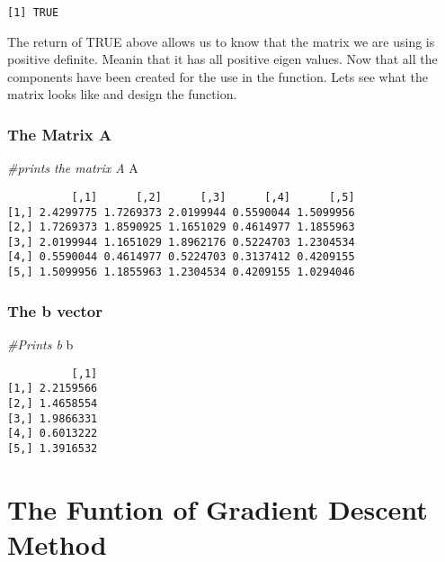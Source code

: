 \documentclass[]{article}
\newenvironment{Shaded}{\begin{snugshade}}{\end{snugshade}}
\newcommand{\CommentTok}[1]{\textcolor[rgb]{0.56,0.35,0.01}{\textit{#1}}}
\newcommand{\NormalTok}[1]{#1}
\begin{document}
\begin{verbatim}
[1] TRUE
\end{verbatim}

The return of TRUE above allows us to know that the matrix we are using
is positive definite. Meanin that it has all positive eigen values. Now
that all the components have been created for the use in the function.
Lets see what the matrix looks like and design the function.

\subsubsection{The Matrix A}\label{the-matrix-a}

\begin{Shaded}
\begin{Highlighting}[]
\CommentTok{#prints the matrix A}
\NormalTok{A}
\end{Highlighting}
\end{Shaded}

\begin{verbatim}
          [,1]      [,2]      [,3]      [,4]      [,5]
[1,] 2.4299775 1.7269373 2.0199944 0.5590044 1.5099956
[2,] 1.7269373 1.8590925 1.1651029 0.4614977 1.1855963
[3,] 2.0199944 1.1651029 1.8962176 0.5224703 1.2304534
[4,] 0.5590044 0.4614977 0.5224703 0.3137412 0.4209155
[5,] 1.5099956 1.1855963 1.2304534 0.4209155 1.0294046
\end{verbatim}

\subsubsection{The b vector}\label{the-b-vector}

\begin{Shaded}
\begin{Highlighting}[]
\CommentTok{#Prints b}
\NormalTok{b}
\end{Highlighting}
\end{Shaded}

\begin{verbatim}
          [,1]
[1,] 2.2159566
[2,] 1.4658554
[3,] 1.9866331
[4,] 0.6013222
[5,] 1.3916532
\end{verbatim}

\section{The Funtion of Gradient Descent
Method}\label{the-funtion-of-gradient-descent-method}
\end{document}
